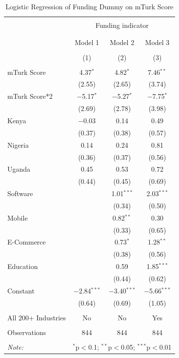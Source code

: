 \documentclass[12pt]{article}
\begin{document}
\begin{table}[!htbp] \centering 
  \caption{Logistic Regression of Funding Dummy on mTurk Score} 
  \label{} 
\scriptsize
\begin{tabular}{@{\extracolsep{5pt}}lccc} 
\\[-1.8ex]\hline 
\hline \\[-1.8ex] 
 & \multicolumn{3}{c}{Funding indicator} \\ 
\cline{2-4} 
\\[-1.8ex] & \multicolumn{3}{c}{} \\ 
 & Model 1 & Model 2 & Model 3 \\ 
\\[-1.8ex] & (1) & (2) & (3)\\ 
\hline \\[-1.8ex] 
 mTurk Score & 4.37$^{*}$ & 4.82$^{*}$ & 7.46$^{**}$ \\ 
  & (2.55) & (2.65) & (3.74) \\ 
  mTurk Score*2 & $-$5.17$^{*}$ & $-$5.27$^{*}$ & $-$7.75$^{*}$ \\ 
  & (2.69) & (2.78) & (3.98) \\ 
  Kenya & $-$0.03 & 0.14 & 0.49 \\ 
  & (0.37) & (0.38) & (0.57) \\ 
  Nigeria & 0.14 & 0.24 & 0.81 \\ 
  & (0.36) & (0.37) & (0.56) \\ 
  Uganda & 0.45 & 0.53 & 0.72 \\ 
  & (0.44) & (0.45) & (0.69) \\ 
  Software &  & 1.01$^{***}$ & 2.03$^{***}$ \\ 
  &  & (0.34) & (0.50) \\ 
  Mobile &  & 0.82$^{**}$ & 0.30 \\ 
  &  & (0.33) & (0.65) \\ 
  E-Commerce &  & 0.73$^{*}$ & 1.28$^{**}$ \\ 
  &  & (0.38) & (0.56) \\ 
  Education &  & 0.59 & 1.85$^{***}$ \\ 
  &  & (0.44) & (0.62) \\ 
  Constant & $-$2.84$^{***}$ & $-$3.40$^{***}$ & $-$5.66$^{***}$ \\ 
  & (0.64) & (0.69) & (1.05) \\ 
 \hline \\[-1.8ex] 
 All 200+ Industries & No & No & Yes  \\ 
 \hline \\[-1.8ex] 
Observations & 844 & 844 & 844 \\ 
\hline 
\hline \\[-1.8ex] 
\textit{Note:}  & \multicolumn{3}{r}{$^{*}$p$<$0.1; $^{**}$p$<$0.05; $^{***}$p$<$0.01} \\ 
\end{tabular} 
\end{table} 
\end{document}

